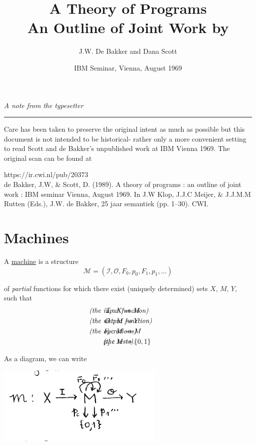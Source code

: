 \documentclass{article}
\title{A Theory of Programs \\ 

\large{
    An Outline of Joint Work by
}}
\author{J.W. De Bakker and Dana Scott}
\date{IBM Seminar, Vienna, August 1969}
\newcommand{\scM}{\mathscr{M}}
\newcommand{\mcI}{\mathcal{I}}
\newcommand{\mcO}{\mathcal{O}}
\begin{document}
\begin{center}
    \large{\textit{A note from the typesetter}} \\
    \hrule
\end{center}

Care has been taken to preserve the original intent as much as possible but this document is not intended to be historical- rather only a more convenient setting to read  Scott and de Bakker's unpublished work at IBM Vienna 1969. The original scan can be found at
\begin{framed}
https://ir.cwi.nl/pub/20373 \\

de Bakker, J.W, \& Scott, D. (1989). A theory of programs : an outline of joint work : IBM seminar Vienna, August 1969. In J.W Klop, J.J.C Meijer, \& J.J.M.M Rutten (Eds.), J.W. de Bakker, 25 jaar semantiek (pp. 1–30). CWI.
\end{framed}


\maketitle

\section{Machines}

A \underline{machine} is a structure 
\begin{equation*}
    \scM = (\mcI, \mcO, F_0, p_0, F_1, p_1, \ldots)
\end{equation*}

of \textit{partial} functions for which there exist (uniquely determined) sets $X$, $M$, $Y$, such that 
\begin{align*}
    \mcI & : X \to M && \hspace{-100pt} \textrm{\textit{(the input function)}} \\
    \mcO & : M \to Y && \hspace{-100pt}\textrm{\textit{(the output function)}} \\
    F_i & : M \to M && \hspace{-100pt}\textrm{\textit{(the operations)}} \\
    p_j & : M \to \{0, 1\} && \hspace{-80pt}\textrm{\textit{(the tests)}}. \\
\end{align*}

As a diagram, we can write
\begin{center}
    \includegraphics[width=230pt]{dg1.png}
\end{center}
\end{document}
